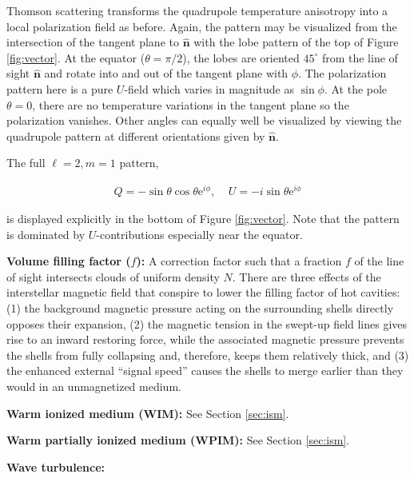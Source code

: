 \documentclass[a4paper,10pt]{article}
\begin{document}
{\noindent}Thomson scattering transforms the quadrupole temperature anisotropy into a local polarization field as before. Again, the pattern may be visualized from the intersection of the tangent plane to $\bm{\hat{n}}$ with the lobe pattern of the top of Figure \ref{fig:vector}. At the equator ($\theta=\pi/2$), the lobes are oriented $45^\circ$ from the line of sight $\bm{\hat{n}}$ and rotate into and out of the tangent plane with $\phi$. The polarization pattern here is a pure $U$-field which varies in magnitude as $\sin\phi$. At the pole $\theta=0$, there are no temperature variations in the tangent plane so the polarization vanishes. Other angles can equally well be visualized by viewing the quadrupole pattern at different orientations given by $\bm{\hat{n}}$.

{\noindent}The full $\ell=2,m=1$ pattern,

\begin{align*}
    Q=-\sin\theta\cos\theta\mathrm{e}^{i\phi},~~~~~U=-i\sin\theta\mathrm{e}^{i\phi}
\end{align*}

{\noindent}is displayed explicitly in the bottom of Figure \ref{fig:vector}. Note that the pattern is dominated by $U$-contributions especially near the equator.

{\noindent}\textbf{Volume filling factor ($f$):} A correction factor such that a fraction $f$ of the line of sight intersects clouds of uniform density $N$. There are three effects of the interstellar magnetic field that conspire to lower the filling factor of hot cavities: (1) the background magnetic pressure acting on the surrounding shells directly opposes their expansion, (2) the magnetic tension in the swept-up field lines gives rise to an inward restoring force, while the associated magnetic pressure prevents the shells from fully collapsing and, therefore, keeps them relatively thick, and (3) the enhanced external ``signal speed'' causes the shells to merge earlier than they would in an unmagnetized medium.

{\noindent}\textbf{Warm ionized medium (WIM):} See Section \ref{sec:ism}. 

{\noindent}\textbf{Warm partially ionized medium (WPIM):} See Section \ref{sec:ism}. 

{\noindent}\textbf{Wave turbulence:}
\end{document}

